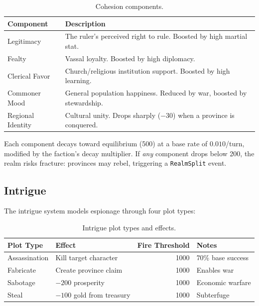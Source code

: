 \documentclass[a4paper, 11pt]{article}
\begin{document}
\begin{table}[htbp]
\centering
\caption{Cohesion components.}
\label{tab:cohesion}
\begin{tabular}{@{}lp{8cm}@{}}
\toprule
\textbf{Component} & \textbf{Description} \\
\midrule
Legitimacy         & The ruler's perceived right to rule. Boosted by high martial stat. \\
Fealty             & Vassal loyalty. Boosted by high diplomacy. \\
Clerical Favor     & Church/religious institution support. Boosted by high learning. \\
Commoner Mood      & General population happiness. Reduced by war, boosted by stewardship. \\
Regional Identity  & Cultural unity. Drops sharply ($-30$) when a province is conquered. \\
\bottomrule
\end{tabular}
\end{table}

Each component decays toward equilibrium (500) at a base rate of $0.010$/turn,
modified by the faction's decay multiplier. If \emph{any} component drops
below 200, the realm risks fracture: provinces may rebel, triggering a
\texttt{RealmSplit} event.

\subsection{Intrigue}
\label{sec:intrigue}

The intrigue system models espionage through four plot types:

\begin{table}[htbp]
\centering
\caption{Intrigue plot types and effects.}
\label{tab:plots}
\begin{tabular}{@{}llrl@{}}
\toprule
\textbf{Plot Type} & \textbf{Effect} & \textbf{Fire Threshold} & \textbf{Notes} \\
\midrule
Assassination & Kill target character     & 1000 & 70\% base success \\
Fabricate     & Create province claim     & 1000 & Enables war \\
Sabotage      & $-200$ prosperity         & 1000 & Economic warfare \\
Steal         & $-100$ gold from treasury & 1000 & Subterfuge \\
\bottomrule
\end{tabular}
\end{table}
\end{document}
